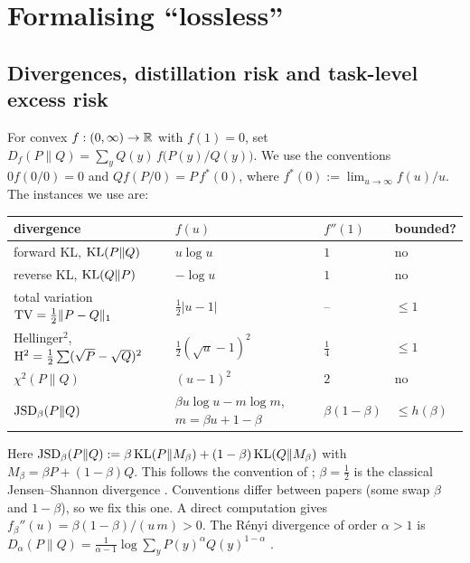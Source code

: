 \section{Formalising ``lossless''}\label{sec:lossless}

\subsection{Divergences, distillation risk and task-level excess risk}

\begin{definition}\label{def:fdiv}
For convex $f:(0,\infty)\to\mathbb{R}$ with $f(1)=0$, set
$D_f(P\|Q)=\sum_{y}Q(y)\,f\!\big(P(y)/Q(y)\big)$. We use the conventions $0f(0/0)=0$ and
$Qf(P/0)=P\,f^*(0)$, where $f^*(0):=\lim_{u\to\infty}f(u)/u$. The instances we use are:
\begin{center}\small
\begin{tabular}{@{}llll@{}}
\toprule
divergence & $f(u)$ & $f''(1)$ & bounded?\\\midrule
forward KL, $\mathrm{KL}(P\|Q)$ & $u\log u$ & $1$ & no\\
reverse KL, $\mathrm{KL}(Q\|P)$ & $-\log u$ & $1$ & no\\
total variation $\mathrm{TV}=\frac12\|P-Q\|_1$ & $\frac12|u-1|$ & -- & $\le1$\\
Hellinger$^2$, $\mathrm{H}^2=\frac12\sum(\sqrt P-\sqrt Q)^2$ & $\frac12(\sqrt u-1)^2$ & $\frac14$ & $\le 1$\\
$\chi^2(P\|Q)$ & $(u-1)^2$ & $2$ & no\\
$\mathrm{JSD}_\beta(P\|Q)$ & $\beta u\log u-m\log m$, $m=\beta u+1-\beta$ & $\beta(1-\beta)$ & $\le h(\beta)$\\\bottomrule
\end{tabular}
\end{center}
Here $\mathrm{JSD}_\beta(P\|Q):=\beta\,\mathrm{KL}(P\|M_\beta)+(1-\beta)\,\mathrm{KL}(Q\|M_\beta)$ with $M_\beta=\beta P+(1-\beta)Q$.
This follows the convention of \citet{agarwal2024gkd}; $\beta=\frac12$ is the classical
Jensen--Shannon divergence \citep{lin1991divergence}. Conventions differ between papers (some swap
$\beta$ and $1-\beta$), so we fix this one. A direct computation gives
$f_\beta''(u)=\beta(1-\beta)/(u\,m)>0$. The Rényi divergence of order $\alpha>1$ is
$D_\alpha(P\|Q)=\frac{1}{\alpha-1}\log\sum_y P(y)^\alpha Q(y)^{1-\alpha}$ \citep{vanerven2014renyi}.
\end{definition}


